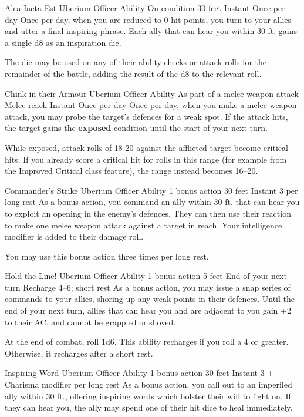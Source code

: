 \ability%
    {Alea Iacta Est}
    {Uberium Officer Ability}
    {On condition}
    {30 feet}
    {Instant}
    {Once per day}
Once per day,
when you are reduced to 0 hit points,
you turn to your allies and utter a final inspiring phrase.
Each ally that can hear you within 30 ft.
gains a single d8 as an inspiration die.

The die may be used on any of their
ability checks or attack rolls
for the remainder of the battle,
adding the result of the d8 to the relevant roll.


\ability%
    {Chink in their Armour}
    {Uberium Officer Ability}
    {As part of a melee weapon attack}
    {Melee reach}
    {Instant}
    {Once per day}
Once per day,
when you make a melee weapon attack,
you may probe the target's defences for a weak spot.
If the attack hits,
the target gains the \textbf{exposed} condition
until the start of your next turn.

While exposed,
attack rolls of 18-20 against the afflicted target
become critical hits.
If you already score a critical hit for rolls in this range
(for example from the Improved Critical class feature),
the range instead becomes 16--20.


\ability%
    {Commander's Strike}
    {Uberium Officer Ability}
    {1 bonus action}
    {30 feet}
    {Instant}
    {3 per long rest}
As a bonus action, you command an ally within 30 ft.
that can hear you to exploit an opening in the enemy's defences.
They can then use their reaction to make one melee weapon attack
against a target in reach.
Your intelligence modifier is added to their damage roll.

You may use this bonus action three times per long rest.


\ability%
    {Hold the Line!}
    {Uberium Officer Ability}
    {1 bonus action}
    {5 feet}
    {End of your next turn}
    {Recharge 4--6; short rest}
As a bonus action,
you may issue a snap series of commands to your allies,
shoring up any weak points in their defences.
Until the end of your next turn,
allies that can hear you and are adjacent to you
gain +2 to their AC, and cannot be grappled or shoved.

At the end of combat, roll 1d6.
This ability recharges if you roll a 4 or greater.
Otherwise, it recharges after a short rest.


\ability%
    {Inspiring Word}
    {Uberium Officer Ability}
    {1 bonus action}
    {30 feet}
    {Instant}
    {3 + Charisma modifier per long rest}
As a bonus action, you call out to an imperiled ally within 30 ft.,
offering inspiring words which bolster their will to fight on.
If they can hear you,
the ally may spend one of their hit dice to heal immediately.

